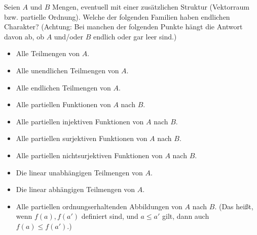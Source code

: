 
\begin{exercise}[280]

Seien $A$ und $B$ Mengen, eventuell mit einer zusätzlichen Struktur
(Vektorraum bzw. partielle Ordnung). Welche der folgenden Familien haben endlichen
Charakter? (Achtung: Bei manchen der folgenden Punkte hängt die Antwort davon ab,
ob $A$ und/oder $B$ endlich oder gar leer sind.)

\begin{itemize}
  \item Alle Teilmengen von $A$.
  \item Alle unendlichen Teilmengen von $A$.
  \item Alle endlichen Teilmengen von $A$.
  \item Alle partiellen Funktionen von $A$ nach $B$.
  \item Alle partiellen injektiven Funktionen von $A$ nach $B$.
  \item Alle partiellen surjektiven Funktionen von $A$ nach $B$.
  \item Alle partiellen nichtsurjektiven Funktionen von $A$ nach $B$.
  \item Die linear unabhängigen Teilmengen von $A$.
  \item Die linear abhängigen Teilmengen von $A$.
  \item Alle partiellen ordnungserhaltenden Abbildungen von $A$ nach $B$.
  (Das heißt, wenn $f(a), f(a')$ definiert sind, und $a \leq a'$ gilt, dann
  auch $f(a) \leq f(a')$.)
\end{itemize}

\end{exercise}


